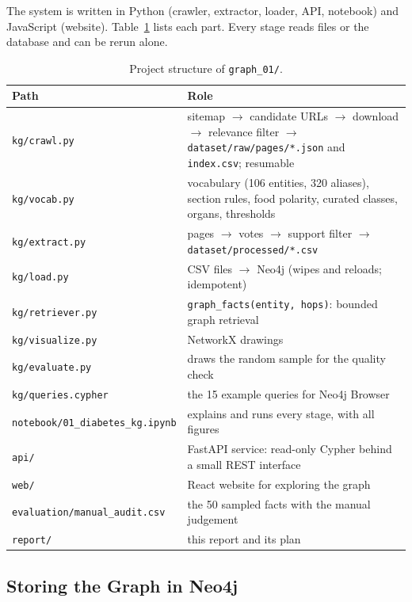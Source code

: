 \documentclass[11pt, a4paper]{article}
\newcommand{\code}[1]{\texttt{#1}}
\begin{document}
The system is written in Python (crawler, extractor, loader, API, notebook) and JavaScript (website). Table~\ref{tab:files} lists each part. Every stage reads files or the database and can be rerun alone.

\begin{table}[H]
\centering
\small
\caption{Project structure of \code{graph\_01/}.}
\label{tab:files}
\begin{tabularx}{\textwidth}{l X}
\toprule
Path & Role \\
\midrule
\code{kg/crawl.py} & sitemap $\rightarrow$ candidate URLs $\rightarrow$ download $\rightarrow$ relevance filter $\rightarrow$ \code{dataset/raw/pages/*.json} and \code{index.csv}; resumable \\
\code{kg/vocab.py} & vocabulary (106 entities, 320 aliases), section rules, food polarity, curated classes, organs, thresholds \\
\code{kg/extract.py} & pages $\rightarrow$ votes $\rightarrow$ support filter $\rightarrow$ \code{dataset/processed/*.csv} \\
\code{kg/load.py} & CSV files $\rightarrow$ Neo4j (wipes and reloads; idempotent) \\
\code{kg/retriever.py} & \code{graph\_facts(entity, hops)}: bounded graph retrieval \\
\code{kg/visualize.py} & NetworkX drawings \\
\code{kg/evaluate.py} & draws the random sample for the quality check \\
\code{kg/queries.cypher} & the 15 example queries for Neo4j Browser \\
\code{notebook/01\_diabetes\_kg.ipynb} & explains and runs every stage, with all figures \\
\code{api/} & FastAPI service: read-only Cypher behind a small REST interface \\
\code{web/} & React website for exploring the graph \\
\code{evaluation/manual\_audit.csv} & the 50 sampled facts with the manual judgement \\
\code{report/} & this report and its plan \\
\bottomrule
\end{tabularx}
\end{table}

\subsection{Storing the Graph in Neo4j}
\label{sec:neo4j}
\end{document}
